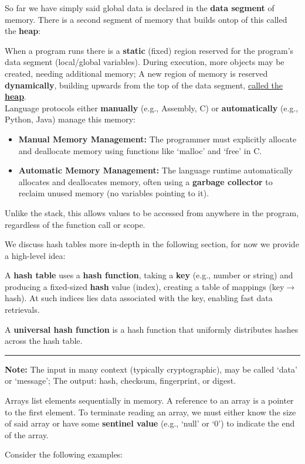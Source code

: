 \noindent
So far we have simply said global data is declared in the \textbf{data segment} of memory. There is a second segment 
of memory that builds ontop of this called the \textbf{heap}:
\begin{Def}

    When a program runs there is a \textbf{static} (fixed) region reserved for the program's data segment (local/global variables). 
    During execution, more objects may be created, needing additional memory; A new region of memory is reserved \textbf{dynamically},
    building upwards from the top of the data segment, \underline{called the \textbf{heap}}.\\
    
    \noindent
    Language protocols either \textbf{manually} (e.g., Assembly, C) or \textbf{automatically} (e.g., Python, Java) manage this memory:
    \begin{itemize}
        \item \textbf{Manual Memory Management:} The programmer must explicitly allocate and deallocate memory using functions like `malloc' and `free' in C.
        \item \textbf{Automatic Memory Management:} The language runtime automatically allocates and deallocates memory, often using a \textbf{garbage collector} to reclaim unused memory (no variables pointing to it).
\end{itemize}

\noindent
Unlike the stack, this allows values to be accessed from anywhere in the program, regardless of the function call or scope.
\end{Def}

\noindent
We discuss hash tables more in-depth in the following section, for now we provide a high-level idea:
\begin{Def}

    \label{def:hash_table}

    A \textbf{hash table} uses a \textbf{hash function}, taking a \textbf{key} (e.g., number or string) and producing a fixed-sized \textbf{hash} value (index),
    creating a table of mappings (key$\to$hash). At such indices lies data associated with the key, enabling fast data retrievals.

    A \textbf{universal hash function} is a hash function that uniformly distributes hashes across the hash table.

    \noindent
    \rule{\textwidth}{0.4pt}
    
    \noindent
    \textbf{Note:} The input in many context (typically cryptographic), may be called `data' or `message'; The output: hash, checksum, fingerprint, or digest.
\end{Def}
\begin{Def}

    Arrays list elements sequentially in memory. A reference to 
    an array is a pointer to the first element. To terminate reading an array, we must either know the size of said 
    array or have some \textbf{sentinel value} (e.g., `null' or `0') to indicate the end of the array.
\end{Def}
\newpage
\noindent
Consider the following examples:

